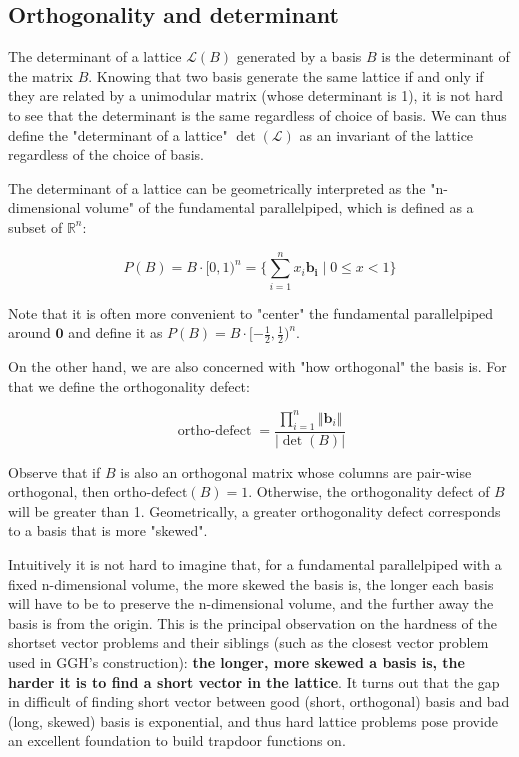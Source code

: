 \documentclass[letterpaper,12pt]{article}
\begin{document}
\subsection{Orthogonality and determinant}
The determinant of a lattice $\mathcal{L}(B)$ generated by a basis $B$ is the determinant of the matrix $B$. Knowing that two basis generate the same lattice if and only if they are related by a unimodular matrix (whose determinant is 1), it is not hard to see that the determinant is the same regardless of choice of basis. We can thus define the "determinant of a lattice" $\det(\mathcal{L})$ as an invariant of the lattice regardless of the choice of basis.

The determinant of a lattice can be geometrically interpreted as the "n-dimensional volume" of the fundamental parallelpiped, which is defined as a subset of $\mathbb{R}^n$:

$$
P(B) = B\cdot [0, 1)^n = \{\sum_{i=1}^n x_i\mathbf{b_i} \mid 0\leq x < 1 \}
$$

Note that it is often more convenient to "center" the fundamental parallelpiped around $\mathbf{0}$ and define it as $P(B) = B\cdot [-\frac{1}{2}, \frac{1}{2})^n$.

On the other hand, we are also concerned with "how orthogonal" the basis is. For that we define the orthogonality defect:

$$
\mathop{\text{ortho-defect}} = \frac{\prod_{i=1}^n \Vert \mathbf{b}_i \Vert}{\vert\det(B)\vert}
$$

Observe that if $B$ is also an orthogonal matrix whose columns are pair-wise orthogonal, then $\text{ortho-defect}(B) = 1$. Otherwise, the orthogonality defect of $B$ will be greater than 1. Geometrically, a greater orthogonality defect corresponds to a basis that is more "skewed".

Intuitively it is not hard to imagine that, for a fundamental parallelpiped with a fixed n-dimensional volume, the more skewed the basis is, the longer each basis will have to be to preserve the n-dimensional volume, and the further away the basis is from the origin. This is the principal observation on the hardness of the shortset vector problems and their siblings (such as the closest vector problem used in GGH's construction): \textbf{the longer, more skewed a basis is, the harder it is to find a short vector in the lattice}. It turns out that the gap in difficult of finding short vector between good (short, orthogonal) basis and bad (long, skewed) basis is exponential, and thus hard lattice problems pose provide an excellent foundation to build trapdoor functions on.
\end{document}
